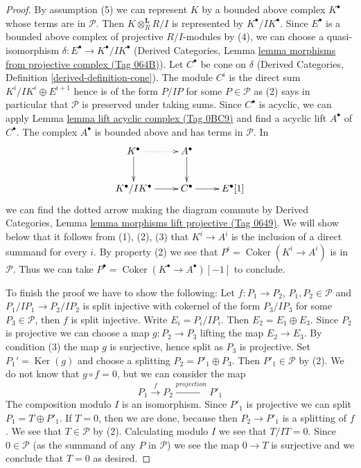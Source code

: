 \documentclass{amsart}
\theoremstyle{plain}
\theoremstyle{definition}
\theoremstyle{remark}
\numberwithin{equation}{subsection}
\def\Ker{\mathop{\mathrm{Ker}}}
\def\Coker{\mathop{\mathrm{Coker}}}
\begin{document}
\begin{proof}
By assumption (5) we can represent $K$ by a bounded above complex 
$K^\bullet$ whose terms are in $\mathcal{P}$. Then $K \otimes_R^\mathbf{L} R/I$
is represented by $K^\bullet/IK^\bullet$. Since $E^\bullet$ is
a bounded above complex of projective $R/I$-modules by (4), 
we can choose a quasi-isomorphism $\delta : E^\bullet \to K^\bullet/IK^\bullet$
(Derived Categories, Lemma
\href{https://stacks.math.columbia.edu/tag/064B}{lemma morphisms from projective complex (Tag 064B)}).
Let $C^\bullet$ be cone on $\delta$
(Derived Categories, Definition \ref{derived-definition-cone}).
The module $C^i$ is the direct sum $K^i/IK^i \oplus E^{i + 1}$
hence is of the form $P/IP$ for some $P \in \mathcal{P}$
as (2) says in particular that $\mathcal{P}$ is preserved under taking sums.
Since $C^\bullet$ is acyclic, we can apply
Lemma \href{https://stacks.math.columbia.edu/tag/0BC9}{lemma lift acyclic complex (Tag 0BC9)} and find a acyclic
lift $A^\bullet$ of $C^\bullet$. The complex $A^\bullet$ is
bounded above and has terms in $\mathcal{P}$. In
$$
\xymatrix{
K^\bullet \ar@{..>}[r] \ar[d] & A^\bullet \ar[d] \\
K^\bullet/IK^\bullet \ar[r] & C^\bullet \ar[r] & E^\bullet[1]
}
$$
we can find the dotted arrow making the diagram commute
by Derived Categories, Lemma
\href{https://stacks.math.columbia.edu/tag/0649}{lemma morphisms lift projective (Tag 0649)}.
We will show below that it follows from (1), (2), (3)
that $K^i \to A^i$ is the inclusion of a direct summand
for every $i$. By property (2) we see that $P^i = \Coker(K^i \to A^i)$
is in $\mathcal{P}$. Thus we can take
$P^\bullet = \Coker(K^\bullet \to A^\bullet)[-1]$ to conclude.

\medskip\noindent
To finish the proof we have to show the following: Let $f : P_1 \to P_2$,
$P_1, P_2 \in \mathcal{P}$ and $P_1/IP_1 \to P_2/IP_2$ is split
injective with cokernel of the form $P_3/IP_3$ for some
$P_3 \in \mathcal{P}$, then $f$ is split injective.
Write $E_i = P_i/IP_i$. Then $E_2 = E_1 \oplus E_3$.
Since $P_2$ is projective we can choose a map $g : P_2 \to P_3$
lifting the map $E_2 \to E_3$. By condition (3) the map $g$
is surjective, hence split as $P_3$ is projective. Set $P_1' = \Ker(g)$
and choose a splitting $P_2 = P'_1 \oplus P_3$. Then $P'_1 \in \mathcal{P}$
by (2). We do not know that
$g \circ f = 0$, but we can consider the map
$$
P_1 \xrightarrow{f} P_2 \xrightarrow{projection} P'_1
$$
The composition modulo $I$ is an isomorphism. Since $P'_1$ is
projective we can split $P_1 = T \oplus P'_1$. If $T = 0$, then
we are done, because then $P_2 \to P'_1$ is a splitting of $f$.
We see that $T \in \mathcal{P}$ by (2).
Calculating modulo $I$ we see that $T/IT = 0$.
Since $0 \in \mathcal{P}$ (as the summand of any $P$ in $\mathcal{P}$)
we see the map $0 \to T$ is surjective and we conclude that $T = 0$
as desired.
\end{proof}
\end{document}
